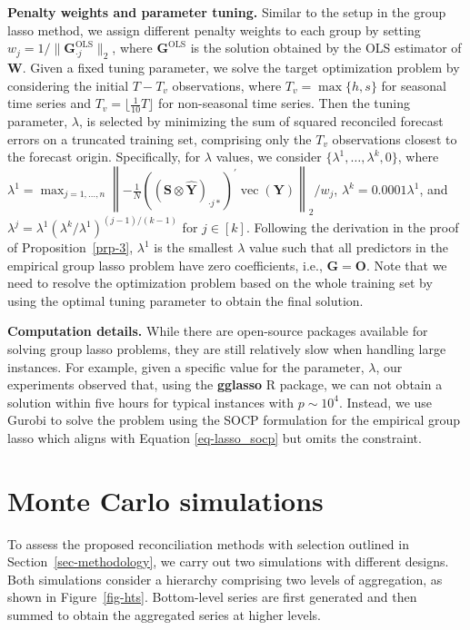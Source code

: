 \documentclass[
  11pt]{article}
\theoremstyle{plain}
\theoremstyle{remark}
\begin{document}
\textbf{Penalty weights and parameter tuning.} Similar to the setup in
the group lasso method, we assign different penalty weights to each
group by setting \(w_j = 1/\|\bm{G}_{\cdot j}^{\text{OLS}}\|_2\), where
\(\bm{G}^{\text{OLS}}\) is the solution obtained by the OLS estimator of
\(\bm{W}\). Given a fixed tuning parameter, we solve the target
optimization problem by considering the initial \(T-T_v\) observations,
where \(T_v = \max\{h, s\}\) for seasonal time series and
\(T_v = \lfloor \frac{1}{10}T \rfloor\) for non-seasonal time series.
Then the tuning parameter, \(\lambda\), is selected by minimizing the
sum of squared reconciled forecast errors on a truncated training set,
comprising only the \(T_v\) observations closest to the forecast origin.
Specifically, for \(\lambda\) values, we consider
\(\{\lambda^{1},\dots,\lambda^{k}, 0\}\), where
\(\lambda^{1} = \max_{j=1, \ldots, n}\left\|-\frac{1}{N}\left(\left(\bm{S} \otimes \hat{\bm{Y}}\right)_{\cdot j*}\right)^{\prime} \operatorname{vec}(\bm{Y})\right\|_2 / w_j\),
\(\lambda^{k} = 0.0001\lambda^{1}\), and
\(\lambda^{j} = \lambda^{1}\left(\lambda^{k} / \lambda^{1}\right)^{(j-1) / (k-1)}\)
for \(j \in [k]\). Following the derivation in the proof of
Proposition~\ref{prp-3}, \(\lambda^{1}\) is the smallest \(\lambda\)
value such that all predictors in the empirical group lasso problem have
zero coefficients, i.e., \(\bm{G} = \bm{O}\). Note that we need to
resolve the optimization problem based on the whole training set by
using the optimal tuning parameter to obtain the final solution.

\textbf{Computation details.} While there are open-source packages
available for solving group lasso problems, they are still relatively
slow when handling large instances. For example, given a specific value
for the parameter, \(\lambda\), our experiments observed that, using the
\textbf{gglasso} R package, we can not obtain a solution within five
hours for typical instances with \(p \sim 10^4\). Instead, we use Gurobi
to solve the problem using the SOCP formulation for the empirical group
lasso which aligns with Equation \eqref{eq-lasso_socp} but omits the
constraint.

\section{Monte Carlo simulations}\label{sec-simulations}

To assess the proposed reconciliation methods with selection outlined in
Section~\ref{sec-methodology}, we carry out two simulations with
different designs. Both simulations consider a hierarchy comprising two
levels of aggregation, as shown in Figure~\ref{fig-hts}. Bottom-level
series are first generated and then summed to obtain the aggregated
series at higher levels.
\end{document}
